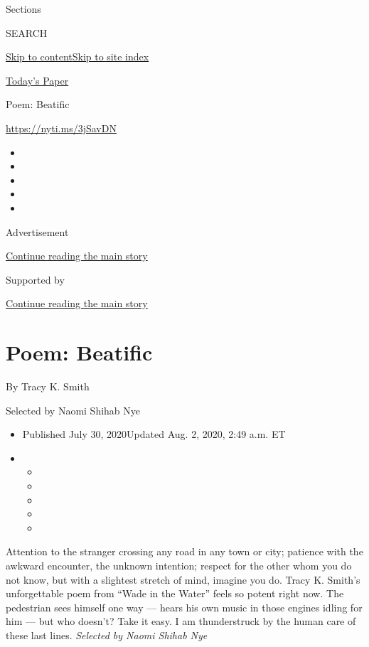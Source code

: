 Sections

SEARCH

\protect\hyperlink{site-content}{Skip to
content}\protect\hyperlink{site-index}{Skip to site index}

\href{https://myaccount.nytimes.com/auth/login?response_type=cookie\&client_id=vi}{}

\href{https://www.nytimes.com/section/todayspaper}{Today's Paper}

Poem: Beatific

\url{https://nyti.ms/3jSavDN}

\begin{itemize}
\item
\item
\item
\item
\item
\end{itemize}

Advertisement

\protect\hyperlink{after-top}{Continue reading the main story}

Supported by

\protect\hyperlink{after-sponsor}{Continue reading the main story}

\hypertarget{poem-beatific}{%
\section{Poem: Beatific}\label{poem-beatific}}

By Tracy K. Smith

Selected by Naomi Shihab Nye

\begin{itemize}
\item
  Published July 30, 2020Updated Aug. 2, 2020, 2:49 a.m. ET
\item
  \begin{itemize}
  \item
  \item
  \item
  \item
  \item
  \end{itemize}
\end{itemize}

Attention to the stranger crossing any road in any town or city;
patience with the awkward encounter, the unknown intention; respect for
the other whom you do not know, but with a slightest stretch of mind,
imagine you do. Tracy K. Smith's unforgettable poem from ``Wade in the
Water'' feels so potent right now. The pedestrian sees himself one way
--- hears his own music in those engines idling for him --- but who
doesn't? Take it easy. I am thunderstruck by the human care of these
last lines. \emph{Selected by Naomi Shihab Nye}

